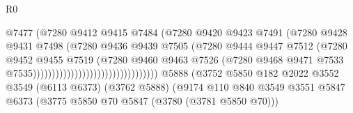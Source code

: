\begin{lexlean}{R0}
\begin{coremodule}
                                                      @7477
                                                      (@7280
                                                        @9412
                                                        @9415
                                                        @7484
                                                        (@7280
                                                          @9420
                                                          @9423
                                                          @7491
                                                          (@7280
                                                            @9428
                                                            @9431
                                                            @7498
                                                            (@7280
                                                              @9436
                                                              @9439
                                                              @7505
                                                              (@7280
                                                                @9444
                                                                @9447
                                                                @7512
                                                                (@7280
                                                                  @9452
                                                                  @9455
                                                                  @7519
                                                                  (@7280
                                                                    @9460
                                                                    @9463
                                                                    @7526
                                                                    (@7280
                                                                      @9468
                                                                      @9471
                                                                      @7533
                                                                      @7535)))))))))))))))))))))))))))))))))
    @5888
    (@3752
      @5850
      @182
      @2022
      @3552
      @3549
      (@6113 @6373)
      (@3762 @5888)
      (@9174
        @110
        @840
        @3549
        @3551
        @5847
        @6373
        (@3775 @5850 @70 @5847 (@3780 (@3781 @5850 @70)))

\end{coremodule}
\end{lexlean}
